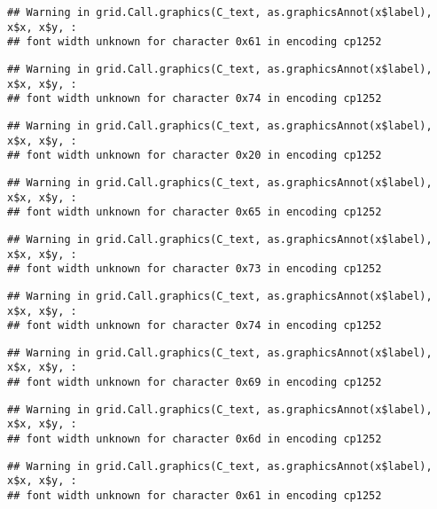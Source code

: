 \documentclass[
]{article}
\begin{document}
\begin{verbatim}
## Warning in grid.Call.graphics(C_text, as.graphicsAnnot(x$label), x$x, x$y, :
## font width unknown for character 0x61 in encoding cp1252
\end{verbatim}

\begin{verbatim}
## Warning in grid.Call.graphics(C_text, as.graphicsAnnot(x$label), x$x, x$y, :
## font width unknown for character 0x74 in encoding cp1252
\end{verbatim}

\begin{verbatim}
## Warning in grid.Call.graphics(C_text, as.graphicsAnnot(x$label), x$x, x$y, :
## font width unknown for character 0x20 in encoding cp1252
\end{verbatim}

\begin{verbatim}
## Warning in grid.Call.graphics(C_text, as.graphicsAnnot(x$label), x$x, x$y, :
## font width unknown for character 0x65 in encoding cp1252
\end{verbatim}

\begin{verbatim}
## Warning in grid.Call.graphics(C_text, as.graphicsAnnot(x$label), x$x, x$y, :
## font width unknown for character 0x73 in encoding cp1252
\end{verbatim}

\begin{verbatim}
## Warning in grid.Call.graphics(C_text, as.graphicsAnnot(x$label), x$x, x$y, :
## font width unknown for character 0x74 in encoding cp1252
\end{verbatim}

\begin{verbatim}
## Warning in grid.Call.graphics(C_text, as.graphicsAnnot(x$label), x$x, x$y, :
## font width unknown for character 0x69 in encoding cp1252
\end{verbatim}

\begin{verbatim}
## Warning in grid.Call.graphics(C_text, as.graphicsAnnot(x$label), x$x, x$y, :
## font width unknown for character 0x6d in encoding cp1252
\end{verbatim}

\begin{verbatim}
## Warning in grid.Call.graphics(C_text, as.graphicsAnnot(x$label), x$x, x$y, :
## font width unknown for character 0x61 in encoding cp1252
\end{verbatim}
\end{document}
